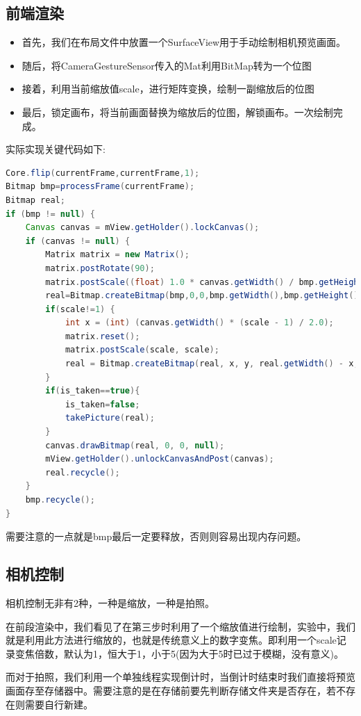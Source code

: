 \documentclass{XDBAthesis}
\begin{document}
\subsection{前端渲染}
\begin{itemize}
    \item 首先，我们在布局文件中放置一个SurfaceView用于手动绘制相机预览画面。
    \item 随后，将CameraGestureSensor传入的Mat利用BitMap转为一个位图
    \item 接着，利用当前缩放值scale，进行矩阵变换，绘制一副缩放后的位图
    \item 最后，锁定画布，将当前画面替换为缩放后的位图，解锁画布。一次绘制完成。
\end{itemize}
实际实现关键代码如下:
\begin{lstlisting}[language=JAVA]
Core.flip(currentFrame,currentFrame,1);
Bitmap bmp=processFrame(currentFrame);
Bitmap real;
if (bmp != null) {
    Canvas canvas = mView.getHolder().lockCanvas();
    if (canvas != null) {
        Matrix matrix = new Matrix();
        matrix.postRotate(90);
        matrix.postScale((float) 1.0 * canvas.getWidth() / bmp.getHeight(), (float) 1.0 * canvas.getHeight() / bmp.getWidth());
        real=Bitmap.createBitmap(bmp,0,0,bmp.getWidth(),bmp.getHeight(),matrix,true);
        if(scale!=1) {
            int x = (int) (canvas.getWidth() * (scale - 1) / 2.0);             int y = (int) (canvas.getHeight() * (scale - 1) / 2.0);
            matrix.reset();
            matrix.postScale(scale, scale);
            real = Bitmap.createBitmap(real, x, y, real.getWidth() - x, real.getHeight() - y, matrix, true);
        }
        if(is_taken==true){
            is_taken=false;
            takePicture(real);
        }
        canvas.drawBitmap(real, 0, 0, null);
        mView.getHolder().unlockCanvasAndPost(canvas);
        real.recycle();
    }
    bmp.recycle();
}  
\end{lstlisting}
需要注意的一点就是bmp最后一定要释放，否则则容易出现内存问题。
\subsection{相机控制}
相机控制无非有2种，一种是缩放，一种是拍照。

在前段渲染中，我们看见了在第三步时利用了一个缩放值进行绘制，实验中，我们就是利用此方法进行缩放的，也就是传统意义上的数字变焦。即利用一个scale记录变焦倍数，默认为1，恒大于1，小于5(因为大于5时已过于模糊，没有意义)。

而对于拍照，我们利用一个单独线程实现倒计时，当倒计时结束时我们直接将预览画面存至存储器中。需要注意的是在存储前要先判断存储文件夹是否存在，若不存在则需要自行新建。
\end{document}
